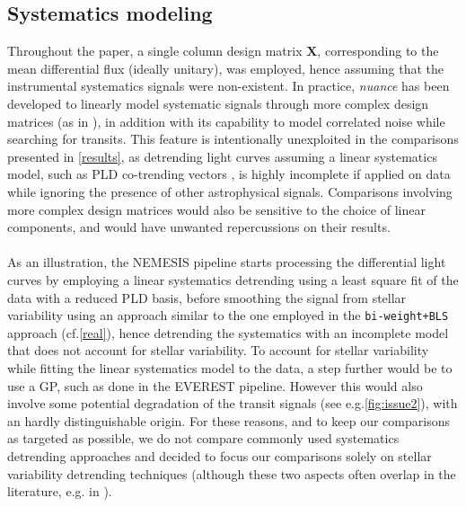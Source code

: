 \documentclass[modern]{aastex631}
\newcommand{\nuancemethod}{\textit{nuance}}
\begin{document}
\subsection{Systematics modeling}\label{systematics}
Throughout the paper, a single column design matrix $\bm{X}$, corresponding to the mean differential flux (ideally unitary), was employed, hence assuming that the instrumental systematics signals were non-existent. In practice, \nuancemethod{} has been developed to linearly model systematic signals through more complex design matrices (as in \citealt{foreman2016}), in addition with its capability to model correlated noise while searching for transits. This feature is intentionally unexploited in the comparisons presented in \autoref{results}, as detrending light curves assuming a linear systematics model, such as PLD co-trending vectors \citep{pld}, is highly incomplete if applied on data while ignoring the presence of other astrophysical signals. Comparisons involving more complex design matrices would also be sensitive to the choice of linear components, and would have unwanted repercussions on their results.\\\\
As an illustration, the NEMESIS pipeline \citep{nemesis} starts processing the differential light curves by employing a linear systematics detrending using a least square fit of the data with a reduced PLD basis, before smoothing the signal from stellar variability using an approach similar to the one employed in the \texttt{bi-weight+BLS} approach (cf.\;\autoref{real}), hence detrending the systematics with an incomplete model that does not account for stellar variability. To account for stellar variability while fitting the linear systematics model to the data, a step further would be to use a GP, such as done in the EVEREST \citep{everest2} pipeline. However this would also involve some potential degradation of the transit signals (see e.g.\;\autoref{fig:issue2}), with an hardly distinguishable origin. For these reasons, and to keep our comparisons as targeted as possible, we do not compare commonly used systematics detrending approaches and decided to focus our comparisons solely on stellar variability detrending techniques (although these two aspects often overlap in the literature, e.g. in \citealt{everest1}).\\\\
\end{document}
